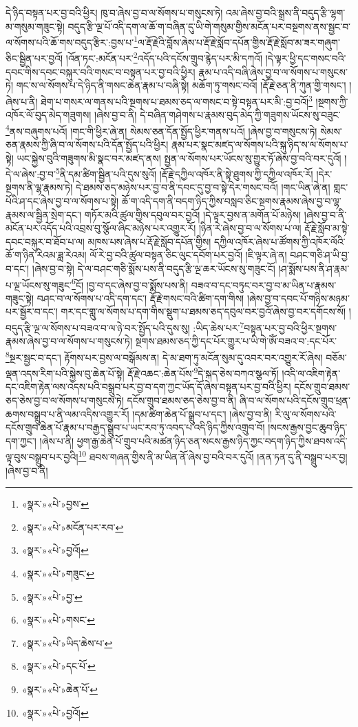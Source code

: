 དེ་ཉིད་བསྟན་པར་བྱ་བའི་ཕྱིར། ཁུ་བ་ཞེས་བྱ་བ་ལ་སོགས་པ་གསུངས་ཏེ། འམ་ཞེས་བྱ་བའི་སྒྲས་ནི་བདུད་རྩི་ལྷག་མ་གསུམ་གཟུང་སྟེ། བདུད་རྩི་ལྔ་པོ་འདི་དག་ལ་ཆོ་ག་བཞིན་དུ་ཡི་གེ་གསུམ་གྱིས་མངོན་པར་བསྔགས་ནས་སྦྱང་བ་ལ་སོགས་པའི་ཆོ་གས་བདུད་རྩིར་:བྱས་པ་\footnote{«སྣར་»«པེ་»བྱས་}ལ་རྡོ་རྗེའི་བློས་ཞེས་པ་རྡོ་རྗེ་སློབ་དཔོན་གྱིས་རྡོ་རྗེ་སློབ་མ་ཟར་གཞུག་ཅིང་སྦྱིན་པར་བྱའོ། །འོན་ཏང་:མངོན་པར་\footnote{«སྣར་»«པེ་»མངོན་པར་རབ་}འདོད་པའི་དངོས་གྲུབ་རྙེད་པར་མི་དཀའོ། །དེ་ལྟར་ཕྱི་དང་གསང་བའི་དབང་གིས་དབང་བསྐུར་བའི་གསང་བ་བསྟན་པར་བྱ་བའི་ཕྱིར། རྣམ་པ་འདི་བཞི་ཞེས་བྱ་བ་ལ་སོགས་པ་གསུངས་ཏེ། གང་ས་ལ་སོགས་པ་དེ་ཉིད་ནི་གསང་ཆེན་རྣམ་པ་བཞི་སྟེ། མཆོག་ཏུ་གསང་བའོ། །རྡོ་རྗེ་ཅན་ནི་ཀུན་གྱི་གསང་། །ཞེས་པ་ནི། ཐེག་པ་གསར་ལ་གནས་པའི་སྔགས་པ་ཐམས་ཅད་ལ་གསང་བ་སྟེ་བསྟན་པར་མི་:བྱ་བའོ།\footnote{«སྣར་»«པེ་»བྱའོ།} །སྔགས་ཀྱི་འཁོར་ལོ་བུད་མེད་གཟུགས། །ཞེས་བྱ་བ་ནི། དེ་བཞིན་གཤེགས་པ་རྣམས་བུད་མེད་ཀྱི་གཟུགས་ཡོངས་སུ་བཟུང་\footnote{«སྣར་»«པེ་»གཟུང་}ནས་བཞུགས་པའོ། །གང་གི་ཕྱིར་ཞེ་ན། སེམས་ཅན་དོན་སྤྱོད་ཕྱིར་གནས་པའོ། །ཞེས་བྱ་བ་གསུངས་ཏེ། སེམས་ཅན་རྣམས་ཀྱི་ཞི་བ་ལ་སོགས་པའི་དོན་སྤྱོད་པའི་ཕྱིར། རྣམ་པར་སྣང་མཛད་ལ་སོགས་པའི་སྐུ་ཉིད་ས་ལ་སོགས་པ་སྟེ། ཡང་སྐྱེས་བུའི་གཟུགས་མི་སྣང་བར་མཛད་ནས། སྤྱན་ལ་སོགས་པར་ཡོངས་སུ་གྱུར་ཏོ་ཞེས་བྱ་བའི་བར་དུའོ། །དེ་ལ་ཞེས་:བྱ་བ་\footnote{«སྣར་»«པེ་»བྱ་}ནི་དམ་ཚིག་སྦྱིན་པའི་དུས་སུའོ། །རྡོ་རྗེ་དཀྱིལ་འཁོར་ནི་སྟེ་ཐུགས་ཀྱི་དཀྱིལ་འཁོར་རོ། །དེར་སྔགས་ནི་ལྷ་རྣམས་ཏེ། དེ་ཐམས་ཅད་མཉེས་པར་བྱ་བ་ནི་དབང་དུ་བྱ་བ་སྟེ་དེར་གསང་བའོ། །གང་ཡིན་ཞེ་ན། གླང་པོའི་ཤ་དང་ཞེས་བྱ་བ་ལ་སོགས་པ་སྟེ། ཆོ་ག་འདི་དག་ནི་བདག་ཉིད་ཀྱིས་བསླབ་ཅིང་སྔགས་རྣམས་ཞེས་བྱ་བ་ལྷ་རྣམས་ལ་སྦྱིན་སྲེག་དང་། གཏོར་མའི་ཚུལ་གྱིས་དབུལ་བར་བྱའོ། །དེ་ལྟར་བྱས་ན་མགོན་པོ་མཉེས། །ཞེས་བྱ་བ་ནི་མངོན་པར་འདོད་པའི་འབྲས་བུ་སྩོལ་ཞིང་མཉེས་པར་འགྱུར་རོ། །ཉིན་རེ་ཞེས་བྱ་བ་ལ་སོགས་པ་ལ། རྡོ་རྗེ་སློབ་མ་སྟེ་དབང་བསྐུར་བ་ཐོབ་པ་ལ། མཁས་པས་ཞེས་པ་རྡོ་རྗེ་སློབ་དཔོན་གྱིས། དཀྱིལ་འཁོར་ཞེས་པ་ཚོགས་ཀྱི་འཁོར་ལོའི་ཆོ་ག་ཉིན་རེའམ་ཟླ་རེའམ། ལོ་རེ་བྱ་བའི་ཚུལ་བསྟན་ཅིང་ལུང་དབོག་པར་བྱའོ། །ཇི་ལྟར་ཞེ་ན། བཤང་གཅི་ཤ་ཡི་བྱ་བ་དང་། །ཞེས་བྱ་བ་སྟེ། དེ་ལ་བཤང་གཅི་སྨོས་པས་ནི་བདུད་རྩི་ལྔ་ཆར་ཡོངས་སུ་གཟུང་ངོ། །ཤ་སྨོས་པས་ནི་ཤ་རྣམ་པ་ལྔ་ཡོངས་སུ་གཟུང་\footnote{«སྣར་»«པེ་»གསང་}ངོ། །བྱ་བ་དང་ཞེས་བྱ་བ་སྨོས་པས་ནི། བཟའ་བ་དང་བཏུང་བར་བྱ་བ་མ་ཡིན་པ་རྣམས་གཟུང་སྟེ། བཤང་བ་ལ་སོགས་པ་འདི་དག་དང་། རྡོ་རྗེ་གསང་བའི་ཚིག་དག་གིས། །ཞེས་བྱ་བ་དབང་པོ་གཉིས་མཉམ་པར་སྦྱོར་བ་དང་། གར་དང་གླུ་ལ་སོགས་པ་དག་གིས་སྡུག་པ་ཐམས་ཅད་དབུལ་བར་བྱའོ་ཞེས་བྱ་བར་དགོངས་སོ། །བདུད་རྩི་ལྔ་ལ་སོགས་པ་བཟའ་བ་ལ་ཉེ་བར་སྤྱོད་པའི་དུས་སུ། :ཡིད་ཆེས་པར་\footnote{«སྣར་»«པེ་»ཡིད་ཆེས་པ་}བསྟན་པར་བྱ་བའི་ཕྱིར་སྔགས་རྣམས་ཞེས་བྱ་བ་ལ་སོགས་པ་གསུངས་ཏེ། སྔགས་ཐམས་ཅད་ཀྱི་དང་པོར་གྱུར་པ་ཡི་གེ་ཨོཾ་བཟའ་བ་:དང་པོར་\footnote{«སྣར་»«པེ་»དང་པོ་}སྔར་སྦྱང་བ་དང་། རྟོགས་པར་བྱས་ལ་བསྒོམས་ན། དེ་མ་ཐག་ཏུ་མངོན་སུམ་དུ་འབར་བར་འགྱུར་རོ་ཞེས། བཅོམ་ལྡན་འདས་རིག་པའི་སྐྱེས་བུ་ཆེན་པོ་སྟེ། རྡོ་རྗེ་འཆང་:ཆེན་པོས་\footnote{«སྣར་»«པེ་»ཆེན་པོ་}དེ་སྐད་ཅེས་བཀའ་སྩལ་ཏོ། །འདི་ལ་འཇིག་རྟེན་དང་འཇིག་རྟེན་ལས་འདས་པའི་བསྒྲུབ་པར་བྱ་བ་དག་ཀྱང་ཡོད་དོ་ཞེས་བསྟན་པར་བྱ་བའི་ཕྱིར། དངོས་གྲུབ་ཐམས་ཅད་ཅེས་བྱ་བ་ལ་སོགས་པ་གསུངས་ཏེ། དངོས་གྲུབ་ཐམས་ཅད་ཅེས་བྱ་བ་ནི། ཞི་བ་ལ་སོགས་པའི་དངོས་གྲུབ་ཕྲན་ཆགས་བསྒྲུབ་པ་ནི་ལམ་འདིས་འགྱུར་རོ། །དམ་ཚིག་ཆེན་པོ་སྒྲུབ་པ་དང་། །ཞེས་བྱ་བ་ནི། རི་ལུ་ལ་སོགས་པའི་དངོས་གྲུབ་ཆེན་པོ་རྣམ་པ་བརྒྱད་སྒྲུབ་པ་ཡང་རབ་ཏུ་འབད་པ་འདི་ཉིད་ཀྱིས་འགྲུབ་བོ། །སངས་རྒྱས་བྱང་ཆུབ་ཉིད་དག་ཀྱང་། །ཞེས་པ་ནི། ཕྱག་རྒྱ་ཆེན་པོ་གྲུབ་པའི་མཚན་ཉིད་ཅན་སངས་རྒྱས་ཉིད་ཀྱང་བདག་ཉིད་ཀྱིས་ཐབས་འདི་ལྟ་བུས་བསྒྲུབ་པར་བྱའི།\footnote{«སྣར་»«པེ་»བྱའོ།} ཐབས་གཞན་གྱིས་ནི་མ་ཡིན་ནོ་ཞེས་བྱ་བའི་བར་དུའོ། །ནན་ཏན་དུ་ནི་བསྒྲུབ་པར་བྱ། །ཞེས་བྱ་བ་ནི། 